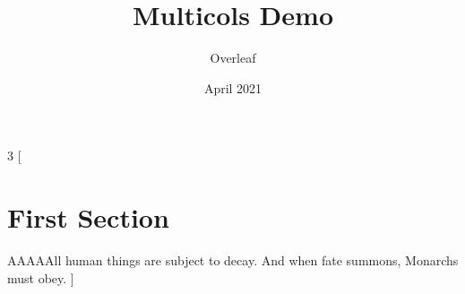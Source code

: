 \documentclass{article}
\title{Multicols Demo}
\author{Overleaf}
\date{April 2021}
\begin{document}
\maketitle

\begin{multicols}{3}
[
\section{First Section}
AAAAAll human things are subject to decay. And when fate summons, Monarchs must obey.
]
\blindtext
\end{multicols}
\end{document}
